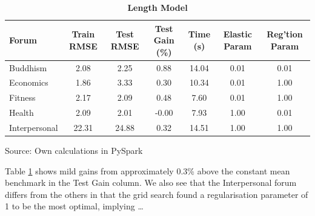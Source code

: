 \documentclass[11pt,preprint, authoryear]{article}
\numberwithin{equation}{section}
\begin{document}
\begin{longtable}[htbp] {@{} lcccccc @{}} 
\caption{\textbf{Length Model}} 
\label{tab:rand_count_model} \\
\toprule
\textbf{Forum} &  \textbf{Train RMSE} &  \textbf{Test RMSE} &  \textbf{Test Gain (\%)} &  \textbf{Time (s)} & \textbf{Elastic Param} &  \textbf{Reg'tion Param} \\
\midrule
Buddhism      &              2.08 &           2.25 &            0.88 &           14.04 &              0.01 &              0.01 \\
Economics     &              1.86 &           3.33 &            0.30 &           10.34 &              0.01 &              1.00 \\
Fitness       &              2.17 &           2.09 &            0.48 &            7.60 &              0.01 &              1.00 \\
Health        &              2.09 &           2.01 &           -0.00 &            7.93 &              1.00 &              0.01 \\
Interpersonal &             22.31 &          24.88 &            0.32 &           14.51 &              1.00 &              1.00 \\
\bottomrule
\end{longtable}\begin{center} Source: Own calculations in PySpark\end{center}

\normalsize

Table \ref{tab:rand_count_model} shows mild gains from approximately
0.3\% above the constant mean benchmark in the Test Gain column. We also
see that the Interpersonal forum differs from the others in that the
grid search found a regularisation parameter of 1 to be the most
optimal, implying \ldots{}

\footnotesize
\end{document}
